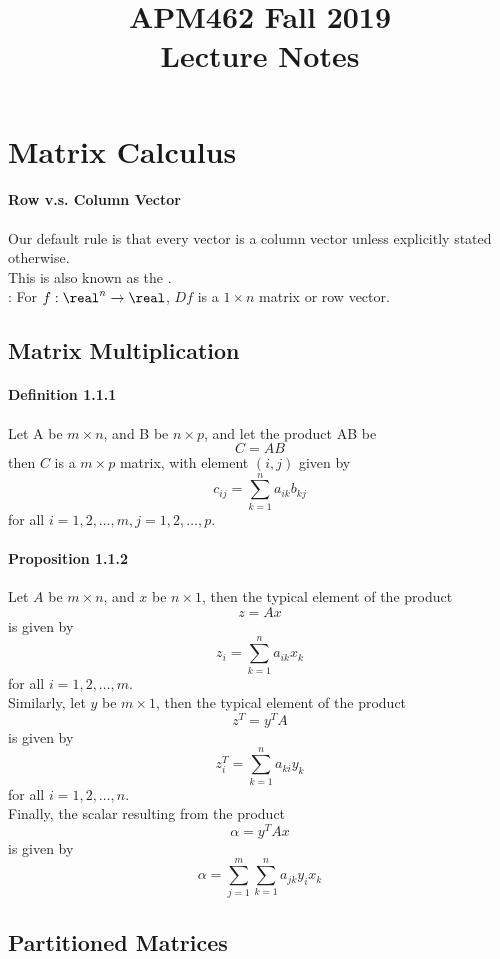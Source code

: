 \documentclass[11pt]{article}
\title{APM462 Fall 2019\\ Lecture Notes}
\author{\blue{\href{https://www.yuchenwyc.com}{Yuchen Wang}}}
\begin{document}
    \maketitle
    \tableofcontents
    \newpage

\section{Matrix Calculus}
\paragraph{Row v.s. Column Vector}
Our default rule is that every vector is a column vector unless explicitly stated otherwise. \\
This is also known as the . \\
: For $f: \real^n \rightarrow \real$, $Df$ is a $ 1 \times n$ matrix or row vector.

\subsection{Matrix Multiplication}
\paragraph{Definition 1.1.1}
Let A be $m \times n$, and B be $n \times p$, and let the product AB be
$$C = AB$$
then $C$ is a $m \times p$ matrix, with element $(i,j)$ given by
$$c_{ij} = \sum_{k=1}^n a_{ik}b_{kj}$$
for all $i = 1, 2, \hdots, m, j = 1,2,\hdots,p$.
\paragraph{Proposition 1.1.2}
Let $A$ be $m \times n$, and $x$ be $n \times 1$, then the typical element of the product
$$ z = Ax$$
is given by
$$z_i = \sum_{k=1}^n a_{ik}x_k$$
for all $i= 1,2,\hdots,m$.\\
Similarly, let $y$ be $m \times 1$, then the typical element of the product
$$z^T = y^TA$$
is given by
$$ z_i^T = \sum_{k=1}^n a_{ki}y_k$$
for all $i = 1, 2,\hdots, n$.  \\
Finally, the scalar resulting from the product
$$\alpha = y^T A x$$
is given by
$$\alpha = \sum_{j=1}^m\sum_{k=1}^n a_{jk}y_i x_k$$

\subsection{Partitioned Matrices}
\end{document}
